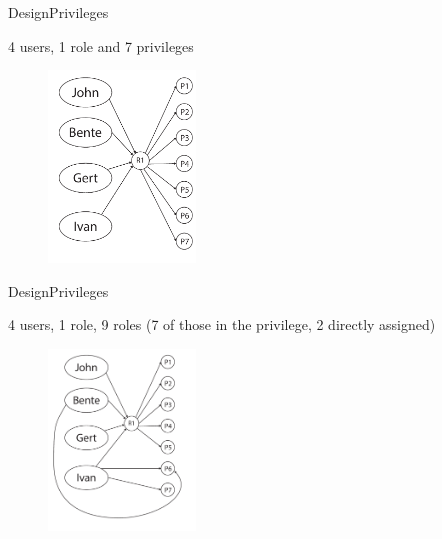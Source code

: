 \begin{frame}{Design}{Privileges}
  \begin{block}{}
  	4 users, 1 role and 7 privileges

  	\begin{figure}[htb]
    	\centering
    	\includegraphics[width=0.35\textwidth]{images/privileges3.pdf}
  	\end{figure}
  \end{block}
\end{frame}

\begin{frame}{Design}{Privileges}
  \begin{block}{}
  	4 users, 1 role, 9 roles (7 of those in the privilege, 2 directly assigned)

  	\begin{figure}[htb]
    	\centering
    	\includegraphics[width=0.35\textwidth]{images/privileges4.pdf}
  	\end{figure}
  \end{block}
\end{frame}

